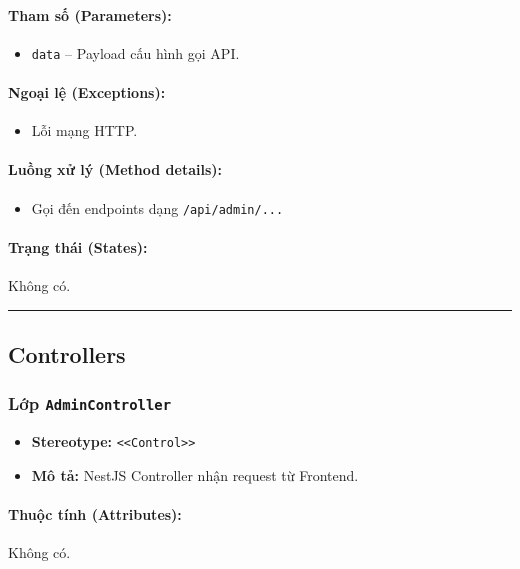 \documentclass[12pt,a4paper]{article}
\begin{document}
\paragraph{Tham số (Parameters):}
\begin{itemize}[leftmargin=*]
    \item \texttt{data} – Payload cấu hình gọi API.
\end{itemize}


\paragraph{Ngoại lệ (Exceptions):}
\begin{itemize}[leftmargin=*]
    \item Lỗi mạng HTTP.
\end{itemize}


\paragraph{Luồng xử lý (Method details):}
\begin{itemize}[leftmargin=*]
    \item Gọi đến endpoints dạng \texttt{/api/admin/...}
\end{itemize}


\paragraph{Trạng thái (States):}
Không có.

\vskip 0.5cm
\noindent\rule{\textwidth}{0.5pt}
\vskip 0.5cm

\subsection{Controllers}


\subsubsection{Lớp \texttt{AdminController}}

\begin{itemize}[leftmargin=*]
    \item \textbf{Stereotype:} \texttt{\textless{}\textless{}Control\textgreater{}\textgreater{}}
    \item \textbf{Mô tả:} NestJS Controller nhận request từ Frontend.
\end{itemize}

\paragraph{Thuộc tính (Attributes):}
Không có.
\end{document}
